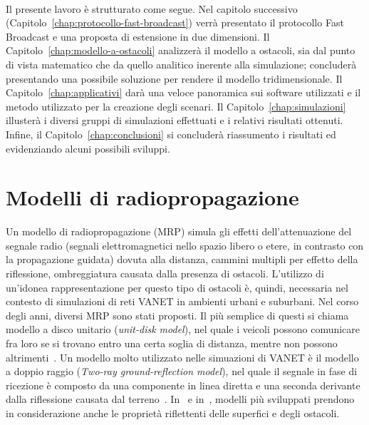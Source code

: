 \paragraph{}
Il presente lavoro è strutturato come segue.
Nel capitolo successivo (Capitolo~\ref{chap:protocollo-fast-broadcast}) verrà presentato il protocollo Fast Broadcast e una proposta di estensione in due dimensioni.
Il Capitolo~\ref{chap:modello-a-ostacoli} analizzerà il modello a ostacoli, sia dal punto di vista matematico che da quello analitico inerente alla simulazione;
concluderà presentando una possibile soluzione per rendere il modello tridimensionale.
Il Capitolo~\ref{chap:applicativi} darà una veloce panoramica sui software utilizzati e il metodo utilizzato per la creazione degli scenari.
Il Capitolo~\ref{chap:simulazioni} illusterà i diversi gruppi di simulazioni effettuati e i relativi risultati ottenuti.
Infine, il Capitolo~\ref{chap:conclusioni}
si concluderà riassumento i risultati ed evidenziando alcuni possibili sviluppi.
%
\section{Modelli di radiopropagazione}\label{sec:modelli-propagazione}
Un modello di radiopropagazione (MRP) simula gli effetti dell'attenuazione del segnale radio (segnali elettromagnetici nello spazio libero o etere, in contrasto con la propagazione guidata)
dovuta alla distanza, cammini multipli per effetto della riflessione, ombreggiatura causata dalla presenza di ostacoli.
L'utilizzo di un'idonea rappresentazione per questo tipo di ostacoli è, quindi, necessaria nel contesto di simulazioni di reti VANET in ambienti urbani
e suburbani.
Nel corso degli anni, diversi MRP sono stati proposti.
Il più semplice di questi si chiama modello a disco unitario (\textit{unit-disk model}), nel quale i veicoli possono comunicare fra loro se si trovano entro una certa soglia
di distanza, mentre non possono altrimenti~\cite{6554832}.
Un modello molto utilizzato nelle simuazioni di VANET è il modello a doppio raggio (\textit{Two-ray ground-reflection model}),
nel quale il segnale in fase di ricezione è composto da una componente in linea diretta e una seconda derivante dalla riflessione causata dal terreno~\cite{DBLP:books/daglib/0091821}.
In~\cite{Schmitz:2006:ERW:1164717.1164730} e in~\cite{Souley2005RealisticUS}, modelli più sviluppati prendono in considerazione anche le proprietà riflettenti delle superfici e degli ostacoli.

